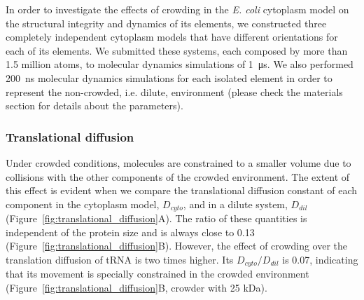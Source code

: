 \documentclass[journal=jacsat,manuscript=article]{achemso}
\begin{document}
In order to investigate the effects of crowding in the \textit{E. coli} cytoplasm model on the structural integrity and dynamics of its elements, we constructed three completely independent cytoplasm models that have different orientations for each of its elements. We submitted these systems, each composed by more than 1.5 million atoms, to molecular dynamics simulations of \SI{1}{\micro\second}. We also performed \SI{200}{\nano\second} molecular dynamics simulations for each isolated element in order to represent the non-crowded, i.e. dilute, environment (please check the materials section for details about the parameters).









\subsubsection{Translational diffusion}

Under crowded conditions, molecules are constrained to a smaller volume due to collisions with the other components of the crowded environment. The extent of this effect is evident when we compare the translational diffusion constant of each component in the cytoplasm model, $D_{cyto}$, and in a dilute system, $D_{dil}$ (Figure~\ref{fig:translational_diffusion}A). The ratio of these quantities is independent of the protein size and is always close to 0.13 (Figure~\ref{fig:translational_diffusion}B). However, the effect of crowding over the translation diffusion of tRNA is two times higher. Its $D_{cyto}/D_{dil}$ is 0.07, indicating that its movement is specially constrained in the crowded environment (Figure~\ref{fig:translational_diffusion}B, crowder with 25 kDa).
\end{document}
